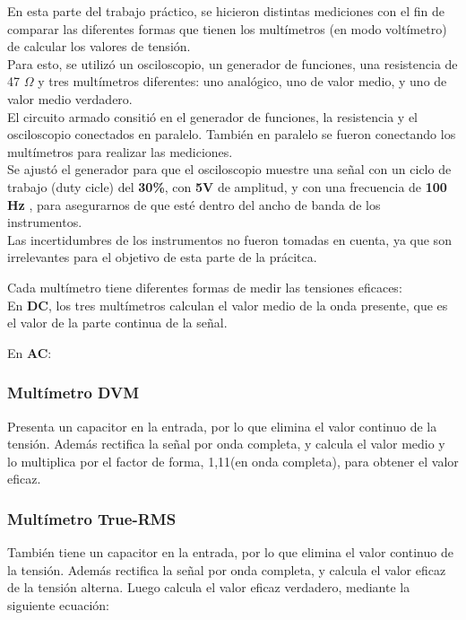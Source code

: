 \documentclass{article}
\begin{document}
En esta parte del trabajo práctico, se hicieron distintas mediciones con el fin de comparar las diferentes formas que tienen los multímetros (en modo voltímetro) de calcular los valores de tensión.\\
\indent Para esto, se utilizó un osciloscopio, un generador de funciones, una resistencia de 47 $\Omega$ y tres multímetros diferentes: uno analógico, uno de valor medio, y uno de valor medio verdadero.\\
\indent El circuito armado consitió en el generador de funciones, la resistencia y el osciloscopio conectados en paralelo. También en paralelo se fueron conectando los multímetros para realizar las mediciones. \\
\indent Se ajustó el generador para que el osciloscopio muestre una señal con un ciclo de trabajo (duty cicle) del \textbf{30\%},
con \textbf{5V} de amplitud, y con una frecuencia de \textbf{100 Hz} , para asegurarnos de que esté dentro del ancho de banda de los instrumentos.\\
\indent Las incertidumbres de los instrumentos no fueron tomadas en cuenta, ya que son irrelevantes para el objetivo de esta parte de la prácitca.
\medskip

Cada multímetro tiene diferentes formas de medir las tensiones eficaces:\\

En \textbf{DC}, los tres multímetros calculan el valor medio de la onda presente, que es el valor de la parte continua de la señal.

En \textbf{AC}:\\



\subsubsection{Multímetro DVM}

Presenta un capacitor en la entrada, por lo que elimina el valor continuo de la tensión. Además rectifica la señal por onda completa, y calcula el valor medio y lo multiplica por el factor de forma, 1,11(en onda completa), para obtener el valor eficaz.\\
\smallskip



\subsubsection{Multímetro True-RMS}

También tiene un capacitor en la entrada, por lo que elimina el valor continuo de la tensión. Además rectifica la señal por onda completa, y calcula el valor eficaz de la tensión alterna. Luego calcula el valor eficaz verdadero, mediante la siguiente ecuación:
\medskip
\end{document}
